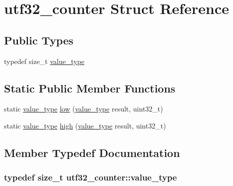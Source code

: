 \hypertarget{structutf32__counter}{\section{utf32\-\_\-counter Struct Reference}
\label{structutf32__counter}
}
\subsection*{Public Types}
\begin{DoxyCompactItemize}
\item 
typedef size\-\_\-t \hyperlink{structutf32__counter_a6fb6728fe1a009958000f0e934fa6500}{value\-\_\-type}
\end{DoxyCompactItemize}
\subsection*{Static Public Member Functions}
\begin{DoxyCompactItemize}
\item 
static \hyperlink{structutf32__counter_a6fb6728fe1a009958000f0e934fa6500}{value\-\_\-type} \hyperlink{structutf32__counter_a3a75f4840e0391ed972ddba621d49480}{low} (\hyperlink{structutf32__counter_a6fb6728fe1a009958000f0e934fa6500}{value\-\_\-type} result, uint32\-\_\-t)
\item 
static \hyperlink{structutf32__counter_a6fb6728fe1a009958000f0e934fa6500}{value\-\_\-type} \hyperlink{structutf32__counter_aa72f5248b1dc5937330ab049bf449251}{high} (\hyperlink{structutf32__counter_a6fb6728fe1a009958000f0e934fa6500}{value\-\_\-type} result, uint32\-\_\-t)
\end{DoxyCompactItemize}


\subsection{Member Typedef Documentation}
\hypertarget{structutf32__counter_a6fb6728fe1a009958000f0e934fa6500}{
\subsubsection[{value\-\_\-type}]{\setlength{\rightskip}{0pt plus 5cm}typedef size\-\_\-t {\bf utf32\-\_\-counter\-::value\-\_\-type}}}\label{structutf32__counter_a6fb6728fe1a009958000f0e934fa6500}


